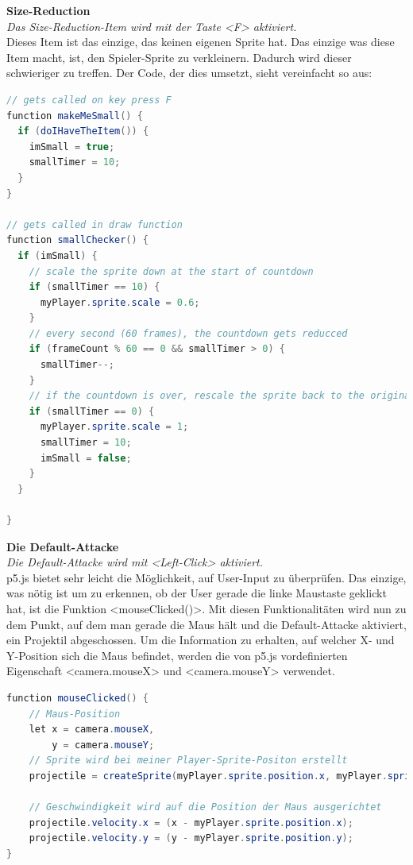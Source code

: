 \textbf{Size-Reduction}
\\
\textit{Das Size-Reduction-Item wird mit der Taste <F> aktiviert.}
\\
Dieses Item ist das einzige, das keinen eigenen Sprite hat. Das einzige was diese Item macht, ist, den Spieler-Sprite zu verkleinern. Dadurch wird dieser schwieriger zu treffen.
Der Code, der dies umsetzt, sieht vereinfacht so aus:
\\
\begin{lstlisting}[caption=Size-Reduction,language=Java,label=lst:impl:sizeReduc]
// gets called on key press F
function makeMeSmall() {
  if (doIHaveTheItem()) {
    imSmall = true;
    smallTimer = 10;
  }
}

// gets called in draw function
function smallChecker() {
  if (imSmall) {
    // scale the sprite down at the start of countdown
    if (smallTimer == 10) {
      myPlayer.sprite.scale = 0.6;
    }
    // every second (60 frames), the countdown gets reducced
    if (frameCount % 60 == 0 && smallTimer > 0) {
      smallTimer--;
    }
    // if the countdown is over, rescale the sprite back to the original form
    if (smallTimer == 0) {
      myPlayer.sprite.scale = 1;
      smallTimer = 10;
      imSmall = false;
    }
  }

}
\end{lstlisting}

\textbf{Die Default-Attacke}
\\
\textit{Die Default-Attacke wird mit <Left-Click> aktiviert.}
\\
p5.js bietet sehr leicht die Möglichkeit, auf User-Input zu überprüfen. Das einzige, was nötig ist um zu erkennen, ob der User gerade die linke Maustaste geklickt hat, ist die Funktion <mouseClicked()>.
Mit diesen Funktionalitäten wird nun zu dem Punkt, auf dem man gerade die Maus hält und die Default-Attacke aktiviert, ein Projektil abgeschossen. Um die Information zu erhalten, auf welcher X- und Y-Position sich die Maus befindet,
 werden die von p5.js vordefinierten Eigenschaft <camera.mouseX> und <camera.mouseY> verwendet.
\\
\begin{lstlisting}[caption=Size-Reduction,language=Java,label=lst:impl:sizeReduc]
    function mouseClicked() {
    // Maus-Position
    let x = camera.mouseX,
        y = camera.mouseY;
    // Sprite wird bei meiner Player-Sprite-Positon erstellt
    projectile = createSprite(myPlayer.sprite.position.x, myPlayer.sprite.position.y, pixelWidth, pixelWidth);
      
    // Geschwindigkeit wird auf die Position der Maus ausgerichtet
    projectile.velocity.x = (x - myPlayer.sprite.position.x);
    projectile.velocity.y = (y - myPlayer.sprite.position.y);
}

\end{lstlisting}

